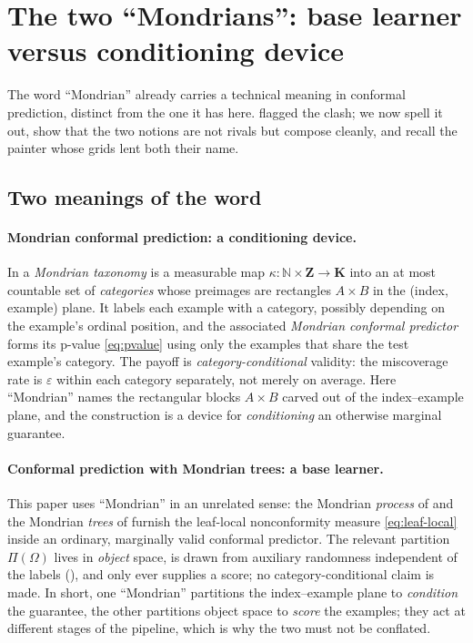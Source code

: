\documentclass[twoside]{article}
\numberwithin{equation}{section}
\theoremstyle{plain}
\theoremstyle{definition}
\theoremstyle{remark}
\begin{document}
\section{The two ``Mondrians'': base learner versus conditioning device}\label{app:mondrian}

The word ``Mondrian'' already carries a technical meaning in conformal prediction,
distinct from the one it has here.  flagged the clash; we now spell it
out, show that the two notions are not rivals but compose cleanly, and recall the painter
whose grids lent both their name.

\subsection{Two meanings of the word}\label{app:mondrian-two}

\paragraph{Mondrian conformal prediction: a conditioning device.}
In \citet[\S4.6]{alrw2} a \emph{Mondrian taxonomy} is a measurable map
$\kappa \colon \mathbb{N} \times \mathbf{Z} \to \mathbf{K}$ into an at most countable set of
\emph{categories} whose preimages are rectangles $A \times B$ in the (index, example)
plane. It labels each example with a category, possibly depending on the example's ordinal
position, and the associated \emph{Mondrian conformal predictor} forms its p-value
\eqref{eq:pvalue} using only the examples that share the test example's category. The
payoff is \emph{category-conditional} validity: the miscoverage rate is $\varepsilon$ within
each category separately, not merely on average. Here ``Mondrian'' names the rectangular
blocks $A \times B$ carved out of the index--example plane, and the construction is a
device for \emph{conditioning} an otherwise marginal guarantee.

\paragraph{Conformal prediction with Mondrian trees: a base learner.}
This paper uses ``Mondrian'' in an unrelated sense: the Mondrian \emph{process} of
\citet{roy2009mondrian} and the Mondrian \emph{trees} of
\citet{lakshminarayanan2014mondrian} furnish the leaf-local nonconformity measure
\eqref{eq:leaf-local} inside an ordinary, marginally valid conformal predictor. The
relevant partition $\Pi(\Omega)$ lives in \emph{object} space, is drawn from auxiliary
randomness independent of the labels (), and only ever supplies a
score; no category-conditional claim is made. In short, one ``Mondrian'' partitions the
index--example plane to \emph{condition} the guarantee, the other partitions object space
to \emph{score} the examples; they act at different stages of the pipeline, which is why
the two must not be conflated.
\end{document}
